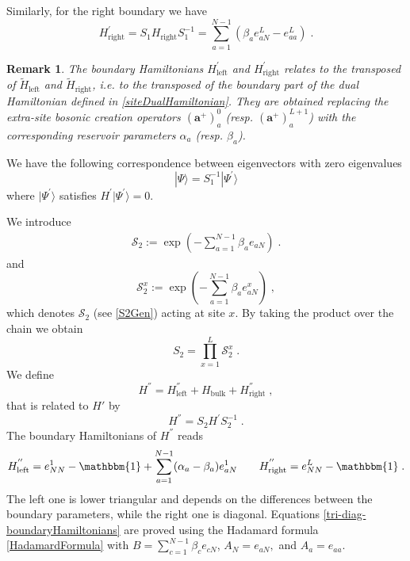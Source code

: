 \documentclass[10pt]{article}
\numberwithin{equation}{section}
\numberwithin{equation}{subsection}
\newtheorem{remark}{Remark}
\newcommand{\co}{\;,}
\newcommand{\dt}{\;.}
\begin{document}
Similarly, for the right boundary we have 
\begin{equation}
H_{\text{right}}^{'}=S_{1}H_{\text{right}}S_{1}^{-1}=
\sum_{a=1}^{N-1}\left(\beta_{a}e_{aN}^{L}-e_{aa}^{L}\right)\dt
\end{equation}
\begin{remark}
	The boundary Hamiltonians $H_{\text{left}}^{'}$ and $H_{\text{right}}^{'}$ relates to the transposed of  $\widetilde{H}_{\text{left}}$ and $\widetilde{H}_{\text{right}}$, i.e. to the transposed of the boundary part of the dual Hamiltonian  defined in \eqref{siteDualHamiltonian}. They are obtained replacing the  extra-site bosonic creation operators $(\mathbf{a}^{+})_{a}^{0}$  (resp. $(\mathbf{a}^{+})_{a}^{L+1}$) with the corresponding reservoir parameters $\alpha_a$ (resp. $\beta_a$).
\end{remark}
We have the following correspondence between eigenvectors with zero eigenvalues
\begin{equation}\label{S1-Inverse}
	|\Psi\rangle =S_{1}^{-1}|\Psi^{'}\rangle
\end{equation}
where $|\Psi^{'}\rangle$ satisfies $H^{'}|\Psi^{'}\rangle=0$.

We introduce
\begin{align} 
	\mathcal{S}_{2}:=\exp{\left(-\sum_{a=1}^{N-1}\beta_{a}e_{aN}\right)}\dt\label{S2Gen}
\end{align}
and
 \begin{equation}
 	\mathcal{S}_{2}^{x}:=\exp{\left(-\sum_{a=1}^{N-1}\beta_{a}e_{aN}^{x}\right)}\co%
 \end{equation}
which denotes $\mathcal{S}_{2}$ (see \eqref{S2Gen}) acting at site $x$. By taking the product over the chain we obtain 
\begin{equation}\label{S2-Whole}
	S_{2}=\prod_{x=1}^{L}\mathcal{S}_{2}^{x}\dt
\end{equation}
We define 
\begin{equation}\label{HSecond}
	H^{''}=H_{\text{left}}^{''}+H_{\text{bulk}}+H_{\text{right}}^{''}\co
\end{equation}
that is related to $H'$ by
\begin{equation}
	H^{''}=S_{2}H^{'}S_{2}^{-1}\dt
\end{equation}
The boundary Hamiltonians of $H^{''}$ reads
\begin{align}\label{tri-diag-boundaryHamiltonians}
	H_{\text{left}}^{''}=e_{NN}^{1}-\mathbbm{1}+\sum_{a=1}^{N-1}(\alpha_{a}-\beta_{a})e_{aN}^{1}\qquad H_{\text{right}}^{''}=e_{NN}^{L}-\mathbbm{1}\dt
\end{align}
The left one is lower triangular and depends on the differences between the boundary parameters, while the right one is diagonal. Equations \eqref{tri-diag-boundaryHamiltonians} are proved using the Hadamard formula \eqref{HadamardFormula} with $B=\sum_{c=1}^{N-1}\beta_{c}e_{cN}$, $A_{N}=e_{aN},$ and $A_{a}=e_{aa}$.
\end{document}
